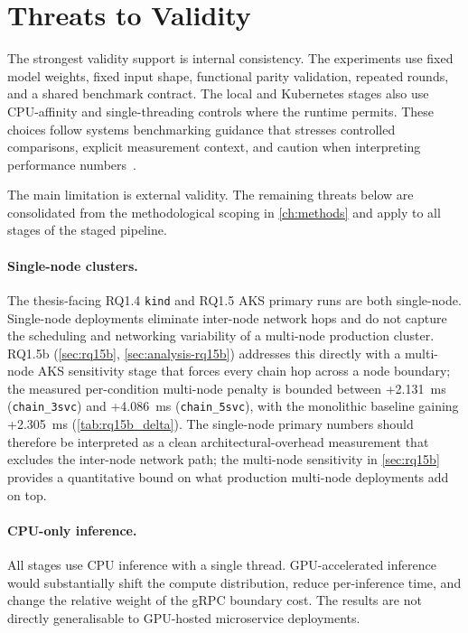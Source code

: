 \section{Threats to Validity}
\label{sec:analysis-threats}

The strongest validity support is internal consistency. The experiments use
fixed model weights, fixed input shape, functional parity validation,
repeated rounds, and a shared benchmark contract. The local and Kubernetes
stages also use CPU-affinity and single-threading controls where the runtime
permits. These choices follow systems benchmarking guidance that stresses
controlled comparisons, explicit measurement context, and caution when
interpreting performance numbers~\cite{benchmarking_sc15}.

The main limitation is external validity. The remaining threats below are
consolidated from the methodological scoping in \cref{ch:methods} and apply
to all stages of the staged pipeline.

\paragraph{Single-node clusters.}
The thesis-facing RQ1.4 \texttt{kind} and RQ1.5 AKS primary runs are both
single-node. Single-node deployments eliminate inter-node network hops and do
not capture the scheduling and networking variability of a multi-node
production cluster. RQ1.5b
(\cref{sec:rq15b}, \cref{sec:analysis-rq15b}) addresses this directly with a
multi-node AKS sensitivity stage that forces every chain hop across a node
boundary; the measured per-condition multi-node penalty is bounded between
+2.131~ms (\texttt{chain\_3svc}) and +4.086~ms (\texttt{chain\_5svc}), with
the monolithic baseline gaining +2.305~ms (\cref{tab:rq15b_delta}). The
single-node primary numbers should therefore be interpreted as a clean
architectural-overhead measurement that excludes the inter-node network
path; the multi-node sensitivity in \cref{sec:rq15b} provides a quantitative
bound on what production multi-node deployments add on top.

\paragraph{CPU-only inference.}
All stages use CPU inference with a single thread. GPU-accelerated inference
would substantially shift the compute distribution, reduce per-inference
time, and change the relative weight of the gRPC boundary cost. The results
are not directly generalisable to GPU-hosted microservice deployments.

